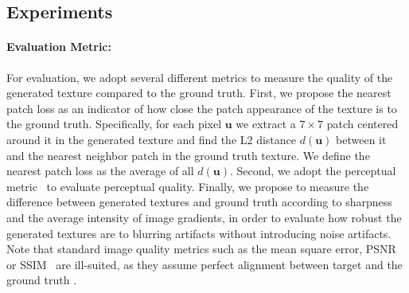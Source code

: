 \subsection{Experiments}

\paragraph*{Evaluation Metric:}
For evaluation, we adopt several different metrics to measure the quality of the generated texture compared to the ground truth. 
First, we propose the nearest patch loss as an indicator of how close the patch appearance of the texture is to the ground truth. Specifically, for each pixel $\mathbf{u}$ we extract a $7\times 7$ patch centered around it in the generated texture and find the L2 distance $d(\mathbf{u})$ between it and the nearest neighbor patch in the ground truth texture. We define the nearest patch loss as the average of all $d(\mathbf{u})$.
Second, we adopt the perceptual metric~\cite{zhang2018unreasonable} to evaluate perceptual quality. 
Finally, we propose to measure the difference between generated textures and ground truth according to sharpness~\cite{vu2011bf} and the average intensity of image gradients, in order to evaluate how robust the generated textures are to blurring artifacts without introducing noise artifacts. 
Note that standard image quality metrics such as the mean square error, PSNR~\cite{de2003improved} or SSIM~\cite{brunet2011mathematical} are ill-suited, as they assume perfect alignment between target and the ground truth \cite{zhang2018unreasonable}.

